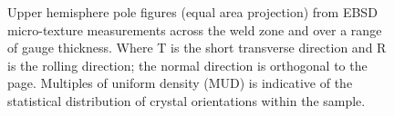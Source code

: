 \begin{figure}[h!t]
		\hfill
		\hfill
		\hfill
		 \centering
		\caption{Upper hemisphere pole figures (equal area projection) from EBSD micro-texture measurements across the weld zone and over a range of gauge thickness. Where T is the short transverse direction and R is the rolling direction; the normal direction is orthogonal to the page. Multiples of uniform density (MUD) is indicative of the statistical distribution of crystal orientations within the sample.}
		\label{fig:EBSD}
	\end{figure}	
	
